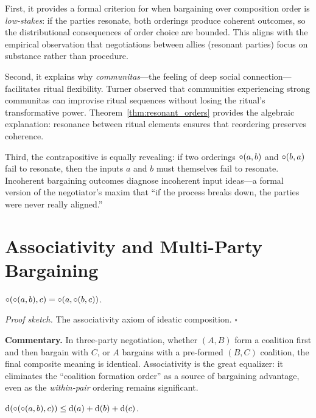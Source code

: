 First, it provides a formal criterion for when bargaining over composition
order is \emph{low-stakes}: if the parties resonate, both orderings produce
coherent outcomes, so the distributional consequences of order choice are
bounded.  This aligns with the empirical observation that negotiations
between allies (resonant parties) focus on substance rather than procedure.

Second, it explains why \emph{communitas}---the feeling of deep social
connection---facilitates ritual flexibility.  Turner observed that
communities experiencing strong communitas can improvise ritual sequences
without losing the ritual's transformative power.  Theorem~\ref{thm:resonant_orders}
provides the algebraic explanation: resonance between ritual elements
ensures that reordering preserves coherence.

Third, the contrapositive is equally revealing: if two orderings
$\circ(a,b)$ and $\circ(b,a)$ fail to resonate, then the inputs
$a$ and $b$ must themselves fail to resonate.  Incoherent bargaining
outcomes diagnose incoherent input ideas---a formal version of the
negotiator's maxim that ``if the process breaks down, the parties were
never really aligned.''

\section{Associativity and Multi-Party Bargaining}
\label{sec:ch17-multi}

\begin{theorem}
\label{thm:three_party_bracket_invariance}
$\circ(\circ(a,b), c) = \circ(a, \circ(b,c))$.
\end{theorem}

\noindent\textit{Proof sketch.}\quad
The associativity axiom of ideatic composition.
\hfill$\square$

\medskip

\noindent\textbf{Commentary.}
In three-party negotiation, whether $(A,B)$ form a coalition first and then
bargain with $C$, or $A$ bargains with a pre-formed $(B,C)$ coalition, the
final composite meaning is identical.  Associativity is the great equalizer:
it eliminates the ``coalition formation order'' as a source of bargaining
advantage, even as the \emph{within-pair} ordering remains significant.

\begin{theorem}
\label{thm:triple_depth_bound}
$\operatorname{d}(\circ(\circ(a,b), c)) \leq \operatorname{d}(a) + \operatorname{d}(b) + \operatorname{d}(c)$.
\end{theorem}

